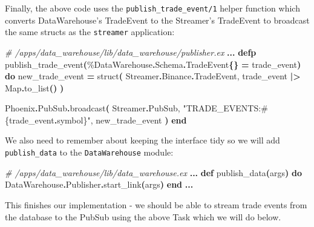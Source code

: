 \documentclass[
  oneside]{book}
\newenvironment{Shaded}{\begin{snugshade}}{\end{snugshade}}
\newcommand{\CommentTok}[1]{\textcolor[rgb]{0.56,0.35,0.01}{\textit{#1}}}
\newcommand{\ConstantTok}[1]{\textcolor[rgb]{0.56,0.35,0.01}{#1}}
\newcommand{\FunctionTok}[1]{\textcolor[rgb]{0.13,0.29,0.53}{\textbf{#1}}}
\newcommand{\KeywordTok}[1]{\textcolor[rgb]{0.13,0.29,0.53}{\textbf{#1}}}
\newcommand{\NormalTok}[1]{#1}
\newcommand{\OperatorTok}[1]{\textcolor[rgb]{0.81,0.36,0.00}{\textbf{#1}}}
\newcommand{\OtherTok}[1]{\textcolor[rgb]{0.56,0.35,0.01}{#1}}
\newcommand{\StringTok}[1]{\textcolor[rgb]{0.31,0.60,0.02}{#1}}
\begin{document}
Finally, the above code uses the \texttt{publish\_trade\_event/1} helper function which converts DataWarehouse's TradeEvent to the Streamer's TradeEvent to broadcast the same structs as the \texttt{streamer} application:

\begin{Shaded}
\begin{Highlighting}[]
  \CommentTok{\# /apps/data\_warehouse/lib/data\_warehouse/publisher.ex}
  \OperatorTok{...}
  \KeywordTok{defp}\NormalTok{ publish\_trade\_event}\FunctionTok{(}\NormalTok{\%}\ConstantTok{DataWarehouse}\OperatorTok{.}\ConstantTok{Schema}\OperatorTok{.}\ConstantTok{TradeEvent}\FunctionTok{\{\}} \OperatorTok{=}\NormalTok{ trade\_event}\FunctionTok{)} \KeywordTok{do}
\NormalTok{    new\_trade\_event }\OperatorTok{=}
\NormalTok{      struct}\FunctionTok{(}
        \ConstantTok{Streamer}\OperatorTok{.}\ConstantTok{Binance}\OperatorTok{.}\ConstantTok{TradeEvent}\NormalTok{,}
\NormalTok{        trade\_event }\OperatorTok{|\textgreater{}} \ConstantTok{Map}\OperatorTok{.}\NormalTok{to\_list}\FunctionTok{()}
      \FunctionTok{)}

    \ConstantTok{Phoenix}\OperatorTok{.}\ConstantTok{PubSub}\OperatorTok{.}\NormalTok{broadcast}\FunctionTok{(}
      \ConstantTok{Streamer}\OperatorTok{.}\ConstantTok{PubSub}\NormalTok{,}
      \StringTok{"TRADE\_EVENTS:}\OtherTok{\#\{}\NormalTok{trade\_event}\OperatorTok{.}\NormalTok{symbol}\OtherTok{\}}\StringTok{"}\NormalTok{,}
\NormalTok{      new\_trade\_event}
    \FunctionTok{)}
  \KeywordTok{end}
\end{Highlighting}
\end{Shaded}

\newpage

We also need to remember about keeping the interface tidy so we will add \texttt{publish\_data} to the \texttt{DataWarehouse} module:

\begin{Shaded}
\begin{Highlighting}[]
  \CommentTok{\# /apps/data\_warehouse/lib/data\_warehouse.ex}
\OperatorTok{...}
  \KeywordTok{def}\NormalTok{ publish\_data}\FunctionTok{(}\NormalTok{args}\FunctionTok{)} \KeywordTok{do}
    \ConstantTok{DataWarehouse}\OperatorTok{.}\ConstantTok{Publisher}\OperatorTok{.}\NormalTok{start\_link}\FunctionTok{(}\NormalTok{args}\FunctionTok{)}
  \KeywordTok{end}
\OperatorTok{...}
\end{Highlighting}
\end{Shaded}

This finishes our implementation - we should be able to stream trade events from the database to the PubSub using the above Task which we will do below.
\end{document}

